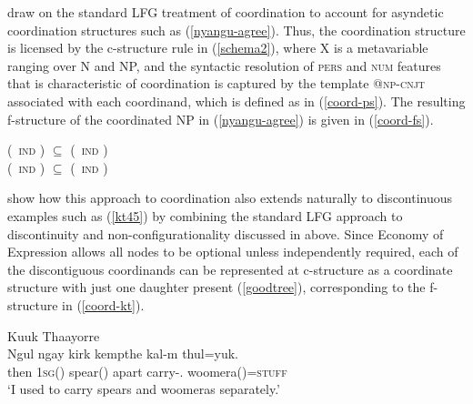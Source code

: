 \documentclass[output=paper,hidelinks]{langscibook}
\begin{document}
\citet{SadlNord2010} draw on the standard LFG treatment of coordination \citep{DalrympleKaplan2000} to account for asyndetic coordination structures such as (\ref{nyangu-agree}). Thus, the coordination structure is licensed by the c-structure rule in (\ref{schema2}), where X is a metavariable ranging over N and NP, and the syntactic resolution of \textsc{pers} and \textsc{num} features that is characteristic of coordination is captured by the template @\textsc{np-cnjt} associated with each coordinand, which is defined as in (\ref{coord-ps}).  The resulting f-structure of the coordinated NP in (\ref{nyangu-agree}) is given in (\ref{coord-fs}). 

\ea \label{schema2} 
\z

\ea \label{coord-ps}
 { (\DOWN\ \textsc{ind}  \PERS) $\subseteq$ (\UP\ \textsc{ind} \PERS)\\
 (\DOWN\ \textsc{ind}  \NUM) $\subseteq$ (\UP\ \textsc{ind} \NUM)\\
}
\z


\citet{SadlNord2010} show how this approach to coordination also extends naturally to discontinuous examples such as (\ref{kt45}) by combining the standard LFG approach to discontinuity and non-configurationality discussed in  above. Since Economy of Expression allows all nodes to be optional unless independently required, each of the discontiguous coordinands can be represented at c-structure as a coordinate structure with just one daughter present (\ref{goodtree}), corresponding to the f-structure in (\ref{coord-kt}).

\ea
\label{kt45} Kuuk Thaayorre\\
\gll Ngul       ngay    kirk    kempthe kal-m   thul=yuk.\\
{then} {1\textsc{sg}(\ERG)} {spear(\ACC)} {apart} {carry-\PST.\IPFV} {woomera(\ACC)=\textsc{stuff}}\\
\glt `I used to carry spears and woomeras separately.' \citep[320]{Gaby06}
\z
\end{document}
